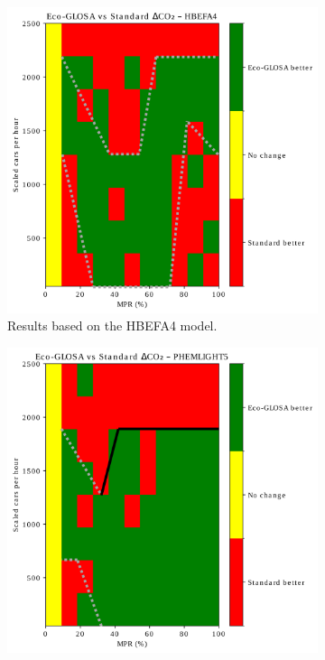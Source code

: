 \begin{figure}[htb]
  \centering
  \begin{subfigure}[b]{0.45\textwidth}
    \includegraphics[width=\textwidth]{data/img/BreakEven/delta_CO2_HBEFA4.pdf}
    \caption{Results based on the HBEFA4 model.}
    \label{fig:BE_EcoStd_HBEFA4}
  \end{subfigure}\hfill
  \begin{subfigure}[b]{0.45\textwidth}
    \includegraphics[width=\textwidth]{data/img/BreakEven/delta_CO2_PHEMLIGHT5.pdf}

\end{subfigure}
\end{figure}
